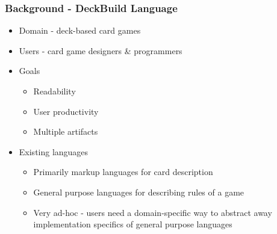
\begin{frame} \frametitle{Background - DeckBuild Language}
\begin{itemize}
\item Domain - deck-based card games
\item Users - card game designers \& programmers
\item Goals
  \begin{itemize}
  \item Readability
  \item User productivity
  \item Multiple artifacts
  \end{itemize}
\item Existing languages
  \begin{itemize}
  \item Primarily markup languages for card description
  \item General purpose languages for describing rules of a game
  \item Very ad-hoc - users need a domain-specific way to abstract
        away implementation specifics of general purpose languages
  \end{itemize}
\end{itemize}
\end{frame}




